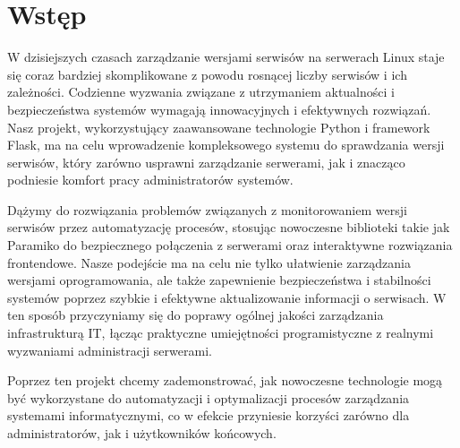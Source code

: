 \chapter*{Wstęp}

W dzisiejszych czasach zarządzanie wersjami serwisów na serwerach Linux staje się coraz bardziej skomplikowane z powodu rosnącej liczby serwisów i ich zależności. Codzienne wyzwania związane z utrzymaniem aktualności i bezpieczeństwa systemów wymagają innowacyjnych i efektywnych rozwiązań. Nasz projekt, wykorzystujący zaawansowane technologie Python i framework Flask, ma na celu wprowadzenie kompleksowego systemu do sprawdzania wersji serwisów, który zarówno usprawni zarządzanie serwerami, jak i znacząco podniesie komfort pracy administratorów systemów.

Dążymy do rozwiązania problemów związanych z monitorowaniem wersji serwisów przez automatyzację procesów, stosując nowoczesne biblioteki takie jak Paramiko do bezpiecznego połączenia z serwerami oraz interaktywne rozwiązania frontendowe. Nasze podejście ma na celu nie tylko ułatwienie zarządzania wersjami oprogramowania, ale także zapewnienie bezpieczeństwa i stabilności systemów poprzez szybkie i efektywne aktualizowanie informacji o serwisach. W ten sposób przyczyniamy się do poprawy ogólnej jakości zarządzania infrastrukturą IT, łącząc praktyczne umiejętności programistyczne z realnymi wyzwaniami administracji serwerami.

Poprzez ten projekt chcemy zademonstrować, jak nowoczesne technologie mogą być wykorzystane do automatyzacji i optymalizacji procesów zarządzania systemami informatycznymi, co w efekcie przyniesie korzyści zarówno dla administratorów, jak i użytkowników końcowych.